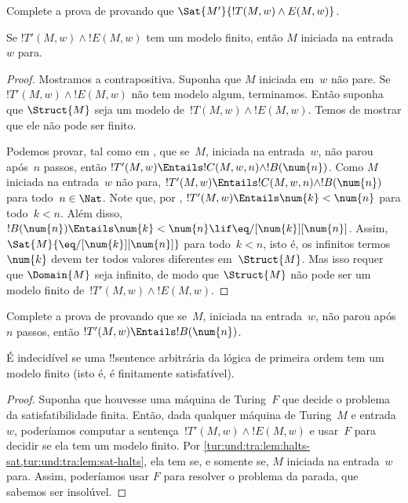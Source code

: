 \documentclass[../../../include/open-logic-section]{subfiles}
\begin{document}
\begin{prob}
  Complete a prova de 
  provando que $\Sat{M'}{!T(M,w) \land E(M,w)}$.
\end{prob}

\begin{lem}
  Se $!T'(M,w) \land !E(M,w)$ tem um modelo finito, então $M$ iniciada
  na entrada~$w$ para.
\end{lem}

\begin{proof}
  Mostramos a contrapositiva. Suponha que $M$ iniciada em~$w$ não
  pare. Se $!T'(M,w) \land !E(M,w)$ não tem modelo algum, terminamos.
  Então suponha que $\Struct{M}$ seja um modelo de~$!T(M,w) \land !E(M, w)$.
  Temos de mostrar que ele não pode ser finito.
  
  Podemos provar, tal como em , que se~$M$,
  iniciada na entrada~$w$, não parou após~$n$ passos, então $!T'(M,w)
  \Entails !C(M, w, n) \land !B(\num{n})$. Como $M$ iniciada na
  entrada~$w$ não para, $!T'(M,w) \Entails !C(M, w, n) \land
  !B(\num{n})$ para todo~$n \in \Nat$. Note que, por
  , $!T'(M,w) \Entails \num{k} < \num{n}$ para
  todo~$k < n$. Além disso, $!B(\num{n}) \Entails \num{k} < \num{n} \lif
  \eq/[\num{k}][\num{n}]$. Assim, $\Sat{M}{\eq/[\num{k}][\num{n}]}$ para
  todo~$k < n$, isto é, os infinitos termos~$\num{k}$ devem ter todos
  valores diferentes em~$\Struct{M}$. Mas isso requer que
  $\Domain{M}$ seja infinito, de modo que $\Struct{M}$ não pode ser um
  modelo finito de~$!T'(M,w) \land !E(M, w)$.
\end{proof}

\begin{prob}
  Complete a prova de  provando
  que se~$M$, iniciada na entrada~$w$, não parou após~$n$ passos,
  então $!T'(M,w) \Entails !B(\num{n})$.
\end{prob}

\begin{thm}
  É indecidível se uma !!{sentence} arbitrária da lógica de primeira
  ordem tem um modelo finito (isto é, é finitamente satisfatível).
\end{thm}

\begin{proof}
  Suponha que houvesse uma máquina de Turing~$F$ que decide o problema
  da satisfatibilidade finita. Então, dada qualquer máquina de
  Turing~$M$ e entrada~$w$, poderíamos computar a sentença~$!T'(M,w)
  \land !E(M,w)$ e usar~$F$ para decidir se ela tem um modelo finito.
  Por \cref{tur:und:tra:lem:halts-sat,tur:und:tra:lem:sat-halts}, ela
  tem se, e somente se, $M$ iniciada na entrada~$w$ para. Assim,
  poderíamos usar $F$ para resolver o problema da parada, que sabemos
  ser insolúvel.
\end{proof}
\end{document}
